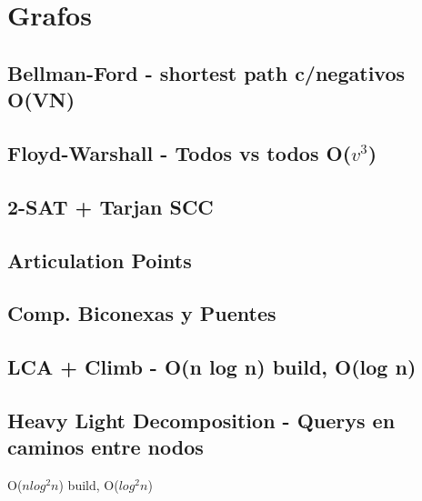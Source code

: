 \section{Grafos}%
\subsection{Bellman-Ford - shortest path c/negativos O(VN)}
\subsection{Floyd-Warshall - Todos vs todos O($v^3$)}
\subsection{2-SAT + Tarjan SCC}
\subsection{Articulation Points}
\subsection{Comp. Biconexas y Puentes} %
\subsection{LCA + Climb - O(n log n) build, O(log n)} %
\subsection{Heavy Light Decomposition - Querys en caminos entre nodos}
O($n log^2 n$) build, O($log^2 n$)
